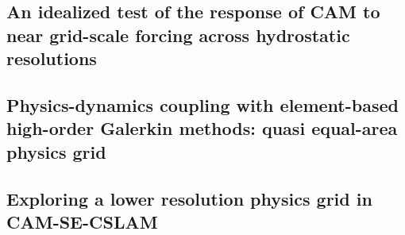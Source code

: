 \documentclass[12pt]{article}
\begin{document}
\newpage
\begin{center}
\section{An idealized test of the response of CAM to near grid-scale forcing across hydrostatic resolutions}\label{sec:chapter3}
\end{center}


\newpage
\begin{center}
\section{Physics-dynamics coupling with element-based high-order Galerkin methods: quasi equal-area physics grid}\label{sec:chapter4}
\end{center}


\newpage
\begin{center}
\section{Exploring a lower resolution physics grid in CAM-SE-CSLAM}\label{sec:chapter5}
\end{center}

\end{document}
